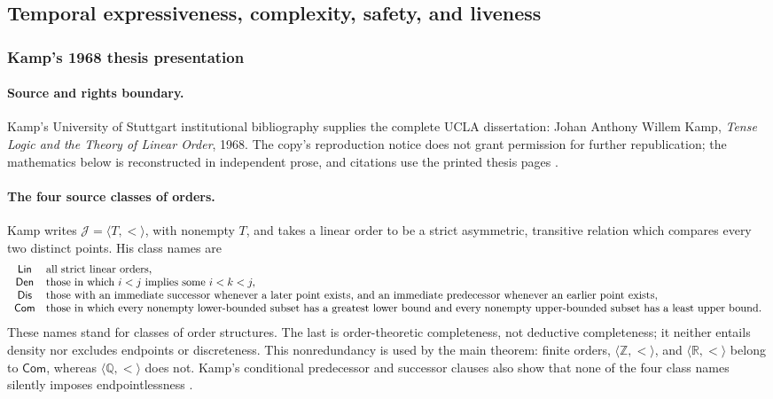 
\subsection{Temporal expressiveness, complexity, safety, and liveness}
\label{sec:p09-presentation-n-c-012}

\subsubsection{Kamp's 1968 thesis presentation}

\paragraph{Source and rights boundary.}
Kamp's University of Stuttgart institutional bibliography supplies the
complete UCLA dissertation: Johan Anthony Willem Kamp, \emph{Tense Logic and
the Theory of Linear Order}, 1968.  The copy's reproduction notice does not
grant permission for further republication; the mathematics below is
reconstructed in independent prose, and citations use the printed thesis pages
\cite{Kamp1968}.

\paragraph{The four source classes of orders.}
Kamp writes \(\mathcal J=\langle T,<\rangle\), with nonempty \(T\), and takes
a linear order to be a strict asymmetric, transitive relation which compares
every two distinct points.  His class names are
\[
\begin{array}{c@{\quad}l}
 \mathsf{Lin} & \text{all strict linear orders},\\
 \mathsf{Den} & \text{those in which }i<j\text{ implies some }i<k<j,\\
 \mathsf{Dis} & \text{those with an immediate successor whenever a later
                      point exists, and an immediate predecessor whenever an
                      earlier point exists},\\
 \mathsf{Com} & \text{those in which every nonempty lower-bounded subset has
                      a greatest lower bound and every nonempty
                      upper-bounded subset has a least upper bound}.
\end{array}
\]
These names stand for classes of order structures.  The last is
order-theoretic completeness, not deductive completeness; it neither entails
density nor excludes endpoints or discreteness.  This nonredundancy is used by
the main theorem: finite orders, \(\langle\mathbb Z,<\rangle\), and
\(\langle\mathbb R,<\rangle\) belong to \(\mathsf{Com}\), whereas
\(\langle\mathbb Q,<\rangle\) does not.  Kamp's conditional predecessor and
successor clauses also show that none of the four class names silently imposes
endpointlessness
\cite[ch.~I, pp.~12--14]{Kamp1968}.

